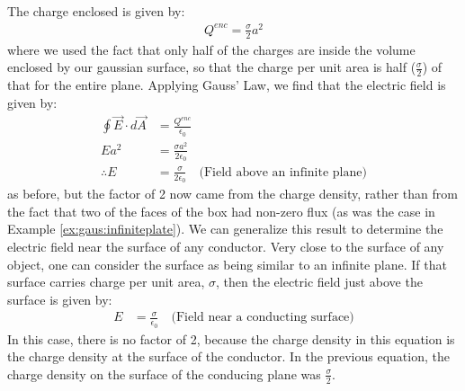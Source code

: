 The charge enclosed is given by:
\begin{align*}
Q^{enc}=\frac{\sigma}{2}a^2
\end{align*}
where we used the fact that only half of the charges are inside the volume enclosed by our gaussian surface, so that the charge per unit area is half ($\frac{\sigma}{2}$) of that for the entire plane. Applying Gauss' Law, we find that the electric field is given by:
\begin{align*}
\oint \vec E\cdot d\vec A&=\frac{Q^{enc}}{\epsilon_0} \\
Ea^2&= \frac{\sigma a^2}{2\epsilon_0}\\
\therefore E&= \frac{\sigma}{2\epsilon_0}\quad \text{(Field above an infinite plane)}
\end{align*}
as before, but the factor of 2 now came from the charge density, rather than from the fact that two of the faces of the box had non-zero flux (as was the case in Example \ref{ex:gaus:infiniteplate}). We can generalize this result to determine the electric field near the surface of any conductor. Very close to the surface of any object, one can consider the surface as being similar to an infinite plane. If that surface carries charge per unit area, $\sigma$, then the electric field just above the surface is given by:
\begin{align*}
 E&= \frac{\sigma}{\epsilon_0} \quad \text{(Field near a conducting surface)}
\end{align*}
In this case, there is no factor of 2, because the charge density in this equation is the charge density at the surface of the conductor. In the previous equation, the charge density on the surface of the conducing plane was $\frac{\sigma}{2}$.

